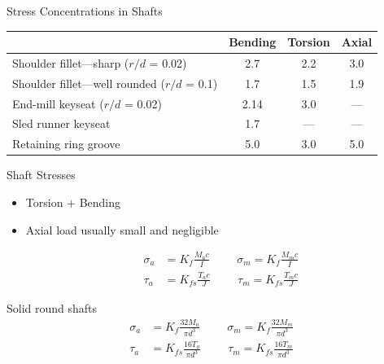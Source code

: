 \documentclass[10pt, svgnames]{beamer}
\begin{document}
\begin{frame}[label={sec:org06ae6d9}]{Stress Concentrations in Shafts}
\begin{figure}[H]
\end{figure}
\begin{table}[h]
  \centering
  \begin{tabular}{lccc}
    \toprule
     & Bending & Torsion & Axial \\
    \midrule
    Shoulder fillet---sharp ($r/d$ = 0.02) & 2.7 & 2.2 & 3.0 \\
    Shoulder fillet---well rounded ($r/d$ = 0.1) & 1.7 & 1.5 & 1.9 \\
    End-mill keyseat ($r/d$ = 0.02) & 2.14 & 3.0 & --- \\
    Sled runner keyseat  & 1.7 & --- & --- \\
    Retaining ring groove & 5.0 & 3.0 & 5.0 \\
    \bottomrule
  \end{tabular}
\end{table}
\end{frame}

\begin{frame}[label={sec:org99c9eba}]{Shaft Stresses}
\begin{itemize}
\item Torsion + Bending
\item Axial load usually small and negligible

\begin{align*}
  \sigma_{a} &= K_{f} \frac{ M_{a} c }{I} \hspace{1cm} \sigma_{m} = K_{f} \frac{M_{m} c}{I} \\
  \tau_{a} &= K_{fs} \frac{ T_{a} c }{J} \hspace{1cm} \tau_{m} = K_{fs} \frac{T_{m} c}{J}
\end{align*}
\end{itemize}
\end{frame}

\begin{frame}[label={sec:org6d82404}]{Solid round shafts}
\begin{align*}
  \sigma_{a} &= K_{f} \frac{ 32 M_{a}}{\pi d^{3}} \hspace{1cm} \sigma_{m} = K_{f} \frac{32M_{m}}{\pi d^{3}} \\[10pt]
  \tau_{a} &= K_{fs} \frac{ 16T_{a}}{\pi d^{3}} \hspace{1cm} \tau_{m} = K_{fs} \frac{16 T_{m}}{\pi d^{3}}
\end{align*}
\end{frame}
\end{document}
